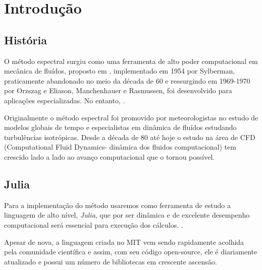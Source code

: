 \chapter{Introdução}
\label{cap:introducao}
\section{História}
O método espectral surgiu como uma ferramenta de alto poder computacional em mecânica de fluídos, proposto em , implementado em 1954 por Sylberman, praticamente abandonado no meio da década de 60 e ressurgindo em 1969-1970 por Orzszag e Eliason, Manchenhauer e Rasmussen, foi desenvolvido para aplicações especializadas. No entanto, .  

Originalmente o método espectral foi promovido por meteorologistas no estudo de modelos globais de tempo e especialistas em dinâmica de fluídos estudando turbulências isotrópicas. Desde a década de 80 até hoje o  estudo na área de CFD (Computational Fluid Dynamics- dinâmica dos fluidos computacional) tem crescido lado a lado ao avanço computacional que o tornou possível.
\section{Julia}
 Para a implementação do método usaremos como ferramenta de estudo a linguagem de alto nível, \emph{Julia}, que por ser dinâmica e de excelente desempenho  computacional será essencial para execução dos cálculos. .

 Apesar de nova, a linguagem criada no MIT vem sendo rapidamente acolhida pela comunidade científica e assim, com seu código open-source, ele é diariamente atualizado e possui um número de  bibliotecas em crescente ascensão.


%
%
%

